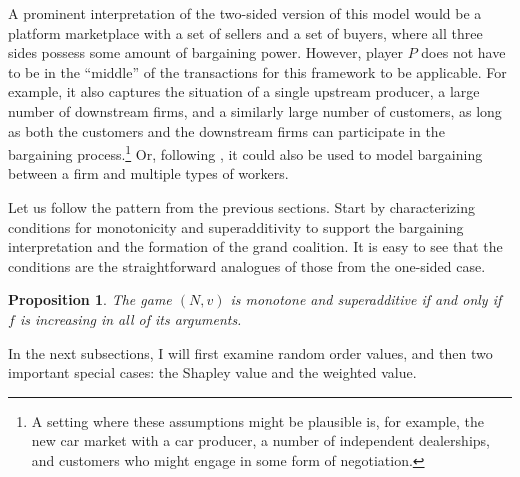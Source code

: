 \documentclass[a4paper]{article}
\newtheorem{proposition}{Proposition}
\newcommand{\dt}{\mathrm{d}t}
\begin{document}
A prominent interpretation of the two-sided version of this model would be a platform marketplace with a set of sellers and a set of buyers, where all three sides possess some amount of bargaining power.
However, player $P$ does not have to be in the ``middle'' of the transactions for this framework to be applicable.
For example, it also captures the situation of a single upstream producer, a large number of downstream firms, and a similarly large number of customers, as long as both the customers and the downstream firms can participate in the bargaining process.\footnote{
    A setting where these assumptions might be plausible is, for example, the new car market with a car producer, a number of independent dealerships, and customers who might engage in some form of negotiation.
}
Or, following \textcite{stole1996intra}, it could also be used to model bargaining between a firm and multiple types of workers.

Let us follow the pattern from the previous sections.
Start by characterizing conditions for monotonicity and superadditivity to support the bargaining interpretation and the formation of the grand coalition.
It is easy to see that the conditions are the straightforward analogues of those from the one-sided case.
\begin{proposition}
    The game $(N, v)$ is monotone and superadditive if and only if $f$ is increasing in all of its arguments.
\end{proposition}

In the next subsections, I will first examine random order values, and then two important special cases: the Shapley value and the weighted value.


\end{document}
